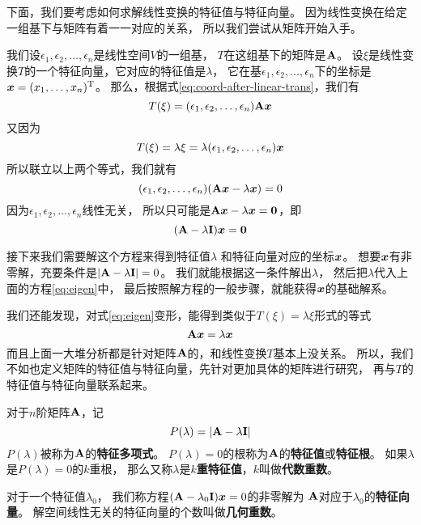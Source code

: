 下面，我们要考虑如何求解线性变换的特征值与特征向量。
因为线性变换在给定一组基下与矩阵有着一一对应的关系，
所以我们尝试从矩阵开始入手。

我们设$\epsilon_1,\epsilon_2,\dots,\epsilon_n$是线性空间$V$的一组基，
$T$在这组基下的矩阵是$\mathbf{A}$。
设$\xi$是线性变换$T$的一个特征向量，它对应的特征值是$\lambda$，
它在基$\epsilon_1,\epsilon_2,\dots,\epsilon_n$下的坐标是
$\bm{x}=(x_1,\dots,x_n)^{\textrm{T}}$。
那么，根据式\eqref{eq:coord-after-linear-trans}，我们有
\[ T(\xi) = (\epsilon_1,\epsilon_2,\dots,\epsilon_n)\mathbf{A}\bm{x} \]
又因为
\[ T(\xi) = \lambda\xi = \lambda(\epsilon_1,\epsilon_2,\dots,\epsilon_n)\bm{x} \]
所以联立以上两个等式，我们就有
\begin{displaymath}
  (\epsilon_1,\epsilon_2,\dots,\epsilon_n)(\mathbf{A}\bm{x} - \lambda\bm{x})=0
\end{displaymath}
因为$\epsilon_1,\epsilon_2,\dots,\epsilon_n$线性无关，
所以只可能是$\mathbf{A}\bm{x} - \lambda\bm{x} = \bm{0}$，即
\begin{equation} \label{eq:eigen}
  (\mathbf{A} - \lambda\mathbf{I})\bm{x} = \bm{0}
\end{equation}

接下来我们需要解这个方程来得到特征值$\lambda$
和特征向量对应的坐标$\bm{x}$。
想要$\bm{x}$有非零解，充要条件是$|\mathbf{A} - \lambda\mathbf{I}| = 0$。
我们就能根据这一条件解出$\lambda$，
然后把$\lambda$代入上面的方程\eqref{eq:eigen}中，
最后按照解方程的一般步骤，就能获得$\bm{x}$的基础解系。

我们还能发现，对式\eqref{eq:eigen}变形，能得到类似于$T(\xi)=\lambda\xi$形式的等式
\begin{displaymath}
\mathbf{A}\bm{x}=\lambda\bm{x}
\end{displaymath}
而且上面一大堆分析都是针对矩阵$\mathbf{A}$的，和线性变换$T$基本上没关系。
所以，我们不如也定义矩阵的特征值与特征向量，先针对更加具体的矩阵进行研究，
再与$T$的特征值与特征向量联系起来。

\begin{definition}[矩阵的特征值和特征向量]
  对于$n$阶矩阵$\mathbf{A}$，记
  \[P(\lambda)=|\mathbf{A}-\lambda\mathbf{I}|\]
  $P(\lambda)$被称为$\mathbf{A}$的\textbf{特征多项式}。
  $P(\lambda)=0$的根称为$\mathbf{A}$的\textbf{特征值}或\textbf{特征根}。
  如果$\lambda$是$P(\lambda)=0$的$k$重根，
  那么又称$\lambda$是\textbf{$k$重特征值}，$k$叫做\textbf{代数重数}。

  对于一个特征值$\lambda_0$，
  我们称方程$(\mathbf{A}-\lambda_0\mathbf{I})\bm{x}=0$的非零解为
  $\mathbf{A}$对应于$\lambda_0$的\textbf{特征向量}。
  解空间线性无关的特征向量的个数叫做\textbf{几何重数}。
\end{definition}

